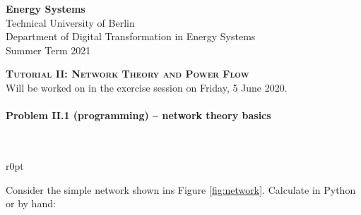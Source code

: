 \documentclass[11pt,a4paper,fleqn]{scrartcl}
\begin{document}
\begin{flushright}
\textbf{Energy Systems}\\
{\small Technical University of Berlin}\\
{\small Department of Digital Transformation in Energy Systems}\\
{\small Summer Term 2021}\\
\end{flushright}

 
 \vspace{-0.5em}
 \hrulefill
 \vspace{0.3em}

\begin{center}
 \textbf{\textsc{\Large Tutorial II: Network Theory and Power Flow}}\\
 \small Will be worked on in the exercise session on Friday, 5 June 2020.\\[1.5em]
\end{center}

\vspace{-0.5em}
\hrulefill
\vspace{0.8em}

\paragraph{Problem II.1 (programming) -- network theory basics \faGroup}~\\

\begin{wrapfigure}[10]{r}{0pt}
 \centering
 \caption{Simple Network}
 \label{fig:network}
\end{wrapfigure}


Consider the simple network shown ins Figure \ref{fig:network}. Calculate in Python or by hand:
\end{document}
